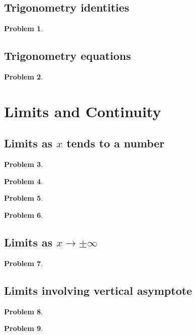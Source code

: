 \documentclass{article}
\newtheorem{problem}{Problem}
\begin{document}
\subsection{Trigonometry identities}
\begin{problem}

\end{problem}

\subsection{Trigonometry equations}
\begin{problem}

\end{problem}


\section{Limits and Continuity}
\subsection{Limits as $x$ tends to a number}\label{secMPSlimitsXtendsToNumer}
\begin{problem}

\end{problem}
\begin{problem}

\end{problem}

\begin{problem}

\end{problem}
\begin{problem}

\end{problem}
\subsection{Limits as $x\to\pm \infty$}\label{secMPSlimitsXtoInfty}
\begin{problem}

\end{problem}

\subsection{Limits involving vertical asymptote}\label{secMPSlimitsVerticalAsymptote}
\begin{problem}

\end{problem}
\begin{problem}

\end{problem}

\end{document}
